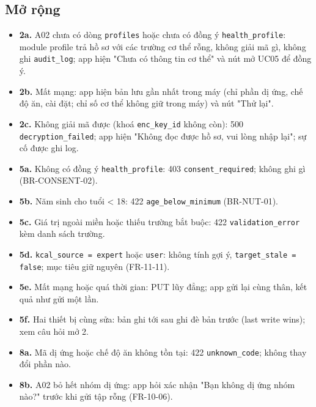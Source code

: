 \subsection{Mở rộng}
\begin{itemize}
\item \textbf{2a.} A02 chưa có dòng {\small\texttt{profiles}} hoặc chưa có đồng ý {\small\texttt{health\_\allowbreak{}\allowbreak{}profile}}: module profile trả hồ sơ với các trường cơ thể rỗng, không giải mã gì, không ghi {\small\texttt{audit\_\allowbreak{}\allowbreak{}log}}; app hiện "Chưa có thông tin cơ thể" và nút mở UC05 để đồng ý.
\item \textbf{2b.} Mất mạng: app hiện bản lưu gần nhất trong máy (chỉ phần dị ứng, chế độ ăn, cài đặt; chỉ số cơ thể không giữ trong máy) và nút "Thử lại".
\item \textbf{2c.} Không giải mã được (khoá {\small\texttt{enc\_\allowbreak{}\allowbreak{}key\_\allowbreak{}\allowbreak{}id}} không còn): 500 {\small\texttt{decryption\_\allowbreak{}\allowbreak{}failed}}; app hiện "Không đọc được hồ sơ, vui lòng nhập lại"; sự cố được ghi log.
\item \textbf{5a.} Không có đồng ý {\small\texttt{health\_\allowbreak{}\allowbreak{}profile}}: 403 {\small\texttt{consent\_\allowbreak{}\allowbreak{}required}}; không ghi gì (BR-\allowbreak{}CONSENT-\allowbreak{}02).
\item \textbf{5b.} Năm sinh cho tuổi < 18: 422 {\small\texttt{age\_\allowbreak{}\allowbreak{}below\_\allowbreak{}\allowbreak{}minimum}} (BR-\allowbreak{}NUT-\allowbreak{}01).
\item \textbf{5c.} Giá trị ngoài miền hoặc thiếu trường bắt buộc: 422 {\small\texttt{validation\_\allowbreak{}\allowbreak{}error}} kèm danh sách trường.
\item \textbf{5d.} {\small\texttt{kcal\_\allowbreak{}\allowbreak{}source = expert}} hoặc {\small\texttt{user}}: không tính gợi ý, {\small\texttt{target\_\allowbreak{}\allowbreak{}stale = false}}; mục tiêu giữ nguyên (FR-\allowbreak{}11-\allowbreak{}11).
\item \textbf{5e.} Mất mạng hoặc quá thời gian: PUT lũy đẳng; app gửi lại cùng thân, kết quả như gửi một lần.
\item \textbf{5f.} Hai thiết bị cùng sửa: bản ghi tới sau ghi đè bản trước (last write wins); xem câu hỏi mở 2.
\item \textbf{8a.} Mã dị ứng hoặc chế độ ăn không tồn tại: 422 {\small\texttt{unknown\_\allowbreak{}\allowbreak{}code}}; không thay đổi phần nào.
\item \textbf{8b.} A02 bỏ hết nhóm dị ứng: app hỏi xác nhận "Bạn không dị ứng nhóm nào?" trước khi gửi tập rỗng (FR-\allowbreak{}10-\allowbreak{}06).

\end{itemize}
